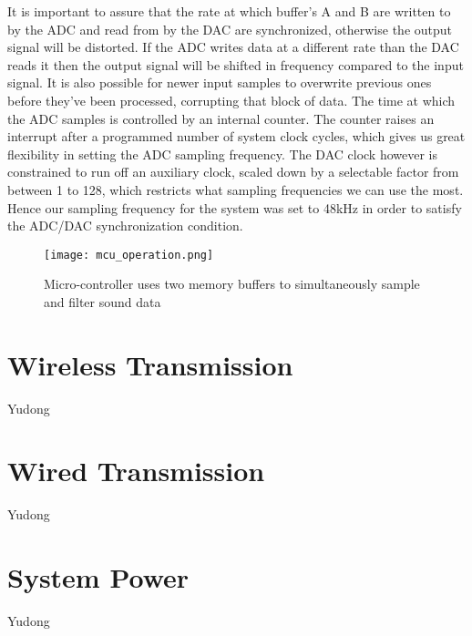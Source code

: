 It is important to assure that the rate at which buffer's A and B are written to by the ADC and read from by the DAC are synchronized, otherwise the output signal will be distorted. If the ADC writes data at a different rate than the DAC reads it then the output signal will be shifted in frequency compared to the input signal. It is also possible for newer input samples to overwrite previous ones before they've been processed, corrupting that block of data. The time at which the ADC samples is controlled by an internal counter. The counter raises an interrupt after a programmed number of system clock cycles, which gives us great flexibility in setting the ADC sampling frequency. The DAC clock however is constrained to run off an auxiliary clock, scaled down by a selectable factor from between 1 to 128, which restricts what sampling frequencies we can use the most. Hence our sampling frequency for the system was set to 48kHz in order to satisfy the ADC/DAC synchronization condition.

\begin{figure}[!htb]
	\centering
		\texttt{[image: mcu\_operation.png]}
	\caption{Micro-controller uses two memory buffers to simultaneously sample and filter sound data}
	\label{fig:mcu_operation}
\end{figure}



\section{Wireless Transmission}
Yudong

\section{Wired Transmission}
Yudong

\section{System Power} \label{sys_power}
Yudong